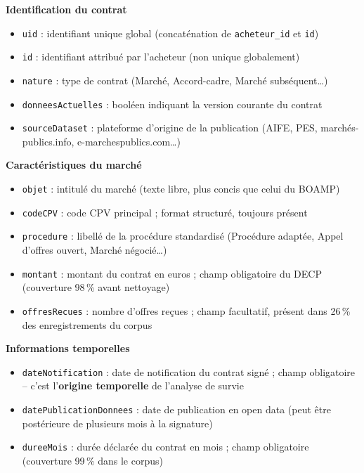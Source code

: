 \documentclass[12pt,a4paper]{article}
\begin{document}
\medskip
\textbf{Identification du contrat}

\begin{itemize}
  \item[---] \texttt{uid} : identifiant unique global (concaténation de
    \texttt{acheteur\_id} et \texttt{id})
  \item[---] \texttt{id} : identifiant attribué par l'acheteur (non unique
    globalement)
  \item[---] \texttt{nature} : type de contrat (Marché, Accord-cadre, Marché
    subséquent\ldots)
  \item[---] \texttt{donneesActuelles} : booléen indiquant la version courante
    du contrat
  \item[---] \texttt{sourceDataset} : plateforme d'origine de la publication
    (AIFE, PES, marchés-publics.info, e-marchespublics.com\ldots)
\end{itemize}

\medskip
\textbf{Caractéristiques du marché}

\begin{itemize}
  \item[---] \texttt{objet} : intitulé du marché (texte libre, plus concis que
    celui du BOAMP)
  \item[---] \texttt{codeCPV} : code CPV principal ; format structuré, toujours
    présent
  \item[---] \texttt{procedure} : libellé de la procédure standardisé
    (Procédure adaptée, Appel d'offres ouvert, Marché négocié\ldots)
  \item[---] \texttt{montant} : montant du contrat en euros ; champ obligatoire
    du DECP (couverture 98\,\% avant nettoyage)
  \item[---] \texttt{offresRecues} : nombre d'offres reçues ; champ facultatif,
    présent dans 26\,\% des enregistrements du corpus
\end{itemize}

\medskip
\textbf{Informations temporelles}

\begin{itemize}
  \item[---] \texttt{dateNotification} : date de notification du contrat signé ;
    champ obligatoire -- c'est l'\textbf{origine temporelle} de l'analyse de
    survie
  \item[---] \texttt{datePublicationDonnees} : date de publication en
    open data (peut être postérieure de plusieurs mois à la signature)
  \item[---] \texttt{dureeMois} : durée déclarée du contrat en mois ; champ
    obligatoire (couverture 99\,\% dans le corpus)
\end{itemize}
\end{document}
